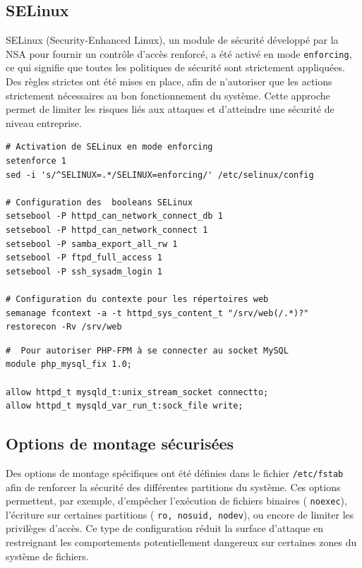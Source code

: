 \documentclass[a4paper,12pt]{article}
\begin{document}
\subsection{SELinux}

SELinux (Security-Enhanced Linux), un module de sécurité développé par la NSA pour fournir un contrôle d'accès renforcé, a été activé en mode \texttt{enforcing}, ce qui signifie que toutes les politiques de sécurité sont strictement appliquées. Des règles strictes ont été mises en place, afin de n'autoriser que les actions strictement nécessaires au bon fonctionnement du système. Cette approche permet de limiter les risques liés aux attaques et d'atteindre une sécurité de niveau entreprise.

\begin{lstlisting}[caption={Configuration SELinux – /etc/selinux/config}]
# Activation de SELinux en mode enforcing
setenforce 1
sed -i 's/^SELINUX=.*/SELINUX=enforcing/' /etc/selinux/config

# Configuration des  booleans SELinux
setsebool -P httpd_can_network_connect_db 1
setsebool -P httpd_can_network_connect 1
setsebool -P samba_export_all_rw 1
setsebool -P ftpd_full_access 1
setsebool -P ssh_sysadm_login 1

# Configuration du contexte pour les répertoires web
semanage fcontext -a -t httpd_sys_content_t "/srv/web(/.*)?"
restorecon -Rv /srv/web
\end{lstlisting}

\begin{lstlisting}[caption={Configuration SELinux – Politique PHP-FPM - MySQL}]
#  Pour autoriser PHP-FPM à se connecter au socket MySQL
module php_mysql_fix 1.0;

allow httpd_t mysqld_t:unix_stream_socket connectto;
allow httpd_t mysqld_var_run_t:sock_file write;
\end{lstlisting}

\subsection{Options de montage sécurisées}

Des options de montage spécifiques ont été définies dans le fichier  \texttt{/etc/fstab} afin de renforcer la sécurité des différentes partitions du système. Ces options permettent, par exemple, d'empêcher l'exécution de fichiers binaires ( \texttt{noexec}), l'écriture sur certaines partitions ( \texttt{ro, nosuid, nodev}), ou encore de limiter les privilèges d'accès. Ce type de configuration réduit la surface d'attaque en restreignant les comportements potentiellement dangereux sur certaines zones du système de fichiers.
\end{document}
